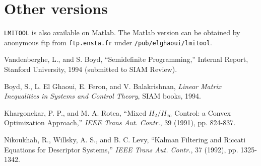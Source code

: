 \section{Other versions}
{\tt LMITOOL} is also available on Matlab. The Matlab version can be
obtained by anonymous ftp from {\tt ftp.ensta.fr} under
{\tt /pub/elghaoui/lmitool}.

\newpage

\begin{thebibliography}{99}
 Vandenberghe, L., and S. Boyd, ``Semidefinite
Programming,'' Internal Report, Stanford University, 1994 (submitted
to SIAM Review).

 Boyd, S., L. El Ghaoui, E. Feron, and V. Balakrishnan,
{\em Linear Matrix Inequalities in Systems and Control Theory}, SIAM
books, 1994.

 Khargonekar, P. P., and M. A. Rotea, ``Mixed
$H_2/H_{\infty}$ Control: a Convex Optimization Approach,'' {\em IEEE
Trans Aut. Contr.}, 39 (1991), pp. 824-837.

 Nikoukhah, R., Willsky, A. S., and B. C. Levy,
``Kalman Filtering and Riccati Equations for Descriptor Systems,'' {\em IEEE
Trans Aut. Contr.}, 37 (1992), pp. 1325-1342.

\end{thebibliography}








